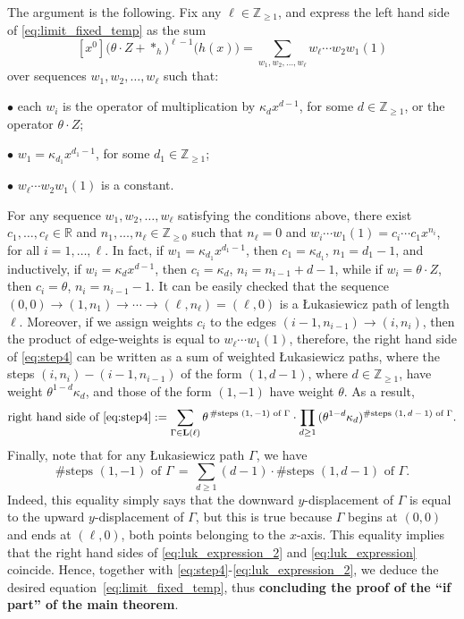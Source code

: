 \documentclass[11pt]{article}
\theoremstyle{plain}
\newcommand{\Z}{\mathbb Z}
\newcommand{\R}{\mathbb R}
\newcommand{\Luk}{\mathbf L}
\begin{document}
The argument is the following.
Fix any $\ell\in\Z_{\ge 1}$, and express the left hand side of \eqref{eq:limit_fixed_temp} as the sum
\begin{equation}\label{eq:step4}
[x^0]\big(\theta\cdot Z + *_h\big)^{\ell-1}\big(h(x)\big) = \sum_{w_1,w_2,\dots,w_\ell}{w_\ell\cdots w_2 w_1(1)}
\end{equation}
over sequences $w_1,w_2,\dots,w_\ell$ such that:

$\bullet$ each $w_i$ is the operator of multiplication by $\kappa_d x^{d-1}$, for some $d\in\Z_{\ge 1}$, or the operator $\theta\cdot Z$;

$\bullet$ $w_1=\kappa_{d_1}x^{d_1-1}$, for some $d_1\in\Z_{\ge 1}$;

$\bullet$ $w_\ell\cdots w_2 w_1(1)$ is a constant.

\noindent For any sequence $w_1,w_2,\dots,w_\ell$ satisfying the conditions above, there exist $c_1,\dots,c_\ell\in\R$ and $n_1,\dots,n_\ell\in\Z_{\ge 0}$ such that $n_\ell=0$ and $w_i\cdots w_1(1)=c_i\cdots c_1 x^{n_i}$, for all $i=1,\dots,\ell$.
In fact, if $w_1=\kappa_{d_1}x^{d_1-1}$, then $c_1=\kappa_{d_1}$, $n_1=d_1-1$, and inductively, if $w_i=\kappa_dx^{d-1}$, then $c_i=\kappa_d$, $n_i=n_{i-1}+d-1$, while if $w_i=\theta\cdot Z$, then $c_i=\theta$, $n_i=n_{i-1}-1$.
It can be easily checked that the sequence $(0,0)\to (1,n_1)\to\cdots\to(\ell,n_\ell)=(\ell,0)$ is a Łukasiewicz path of length $\ell$.
Moreover, if we assign weights $c_i$ to the edges $(i-1,n_{i-1})\to(i,n_i)$, then the product of edge-weights is equal to $w_\ell\cdots w_1(1)$, therefore, the right hand side of \eqref{eq:step4} can be written as a sum of weighted Łukasiewicz paths, where the steps $(i,n_i)-(i-1,n_{i-1})$ of the form $(1,d-1)$, where $d\in\Z_{\ge 1}$, have weight $\theta^{1-d}\kappa_d$, and those of the form $(1,-1)$ have weight $\theta$.
As a result,
\begin{equation}\label{eq:luk_expression_2}
\text{right hand side of }\eqref{eq:step4} := \sum_{\Gamma\in\Luk(\ell)}{ \theta^{\,\#\text{steps $(1,-1)$ of }\Gamma}\cdot\prod_{d\ge 1}{(\theta^{1-d}\kappa_d)^{\#\text{steps $(1,d-1)$ of }\Gamma}} }.
\end{equation}
Finally, note that for any Łukasiewicz path $\Gamma$, we have
\[
\#\text{steps $(1,-1)$ of }\Gamma \,=\, \sum_{d\ge 1}{ (d-1)\cdot\#\text{steps $(1,d-1)$ of }\Gamma}.
\]
Indeed, this equality simply says that the downward $y$-displacement of $\Gamma$ is equal to the upward $y$-displacement of $\Gamma$, but this is true because $\Gamma$ begins at $(0,0)$ and ends at $(\ell,0)$, both points belonging to the $x$-axis.
This equality implies that the right hand sides of \eqref{eq:luk_expression_2} and \eqref{eq:luk_expression} coincide.
Hence, together with \eqref{eq:step4}-\eqref{eq:luk_expression_2}, we deduce the desired equation~\eqref{eq:limit_fixed_temp}, thus \textbf{concluding the proof of the ``if part'' of the main theorem}.
\end{document}
